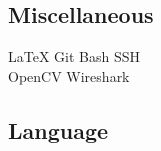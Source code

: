 \documentclass[letterpaper]{deedy-resume} %
\begin{document}
\begin{minipage}[t]{0.33\textwidth}
\sectionspace

\subsection{Miscellaneous}
LaTeX \textbullet{} Git \textbullet{} Bash \textbullet{} SSH\\
OpenCV \textbullet{} Wireshark 

\sectionspace %

\subsection{Language}

%
%
%


%
%


%
%
%
%
%





\end{minipage}
\end{document}
